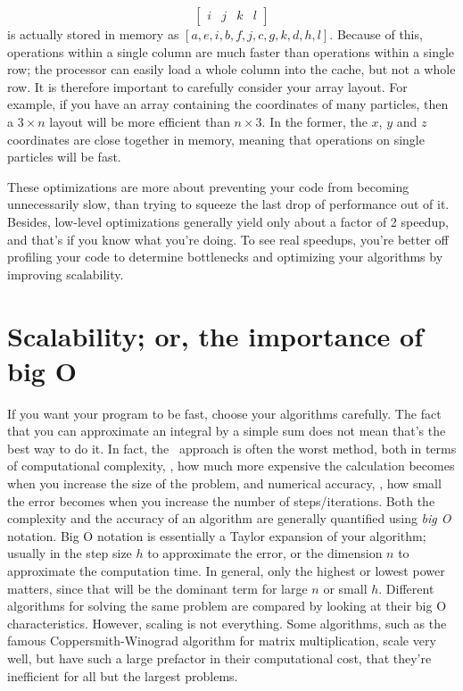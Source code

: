 \begin{itemize}
\begin{equation*}
\begin{bmatrix}
        i & j & k & l
    \end{bmatrix}
    \end{equation*}
    is actually stored in memory as $\left[a,e,i,b,f,j,c,g,k,d,h,l\right]$.
    Because of this, operations within a single column are much faster than operations within a single row; the processor can easily load a whole column into the cache, but not a whole row.
    It is therefore important to carefully consider your array layout.
    For example, if you have an array containing the coordinates of many particles, then a $3\times n$ layout will be more efficient than $n\times 3$.
    In the former, the $x$, $y$ and $z$ coordinates are close together in memory, meaning that operations on single particles will be fast.
\end{itemize}
These optimizations are more about preventing your code from becoming unnecessarily slow, than trying to squeeze the last drop of performance out of it.
Besides, low-level optimizations generally yield only about a factor of 2 speedup, and that's if you know what you're doing.
To see real speedups, you're better off profiling your code to determine bottlenecks and optimizing your algorithms by improving scalability.

\section{Scalability; or, the importance of big O}

If you want your program to be fast, choose your algorithms carefully.
The fact that you can approximate an integral by a simple sum does not mean that's the best way to do it.
In fact, the \naive\ approach is often the worst method, both in terms of computational complexity, \ie, how much more expensive the calculation becomes when you increase the size of the problem, and numerical accuracy, \ie, how small the error becomes when you increase the number of steps/iterations.
Both the complexity and the accuracy of an algorithm are generally quantified using \emph{big O} notation.
Big O notation is essentially a Taylor expansion of your algorithm; usually in the step size $h$ to approximate the error, or the dimension $n$ to approximate the computation time.
In general, only the highest or lowest power matters, since that will be the dominant term for large $n$ or small $h$.
Different algorithms for solving the same problem are compared by looking at their big O characteristics.
However, scaling is not everything.
Some algorithms, such as the famous Coppersmith-Winograd algorithm for matrix multiplication, scale very well, but have such a large prefactor in their computational cost, that they're inefficient for all but the largest problems.


